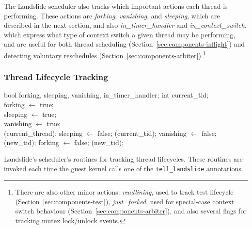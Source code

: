 The Landslide scheduler also tracks which important actions each thread is performing. These actions are {\em forking}, {\em vanishing}, and {\em sleeping}, which are described in the next section, and also {\em in\_timer\_handler} and {\em in\_context\_switch}, which express what type of context switch a given thread may be performing, and are useful for both thread scheduling (Section~\ref{sec:components-inflight}) and detecting voluntary reschedules (Section~\ref{sec:components-arbiter}).\footnote{
There are also other minor actions: {\em readlining}, used to track test lifecycle (Section~\ref{sec:components-test}), {\em just\_forked}, used for special-case context switch behaviour (Section~\ref{sec:components-arbiter}), and also several flags for tracking mutex lock/unlock events.}

\subsubsection{Thread Lifecycle Tracking}

\begin{algorithm}[t]
	\footnotesize
	\begin{algorithmic}
		\State bool forking, sleeping, vanishing, in\_timer\_handler;
		\State int current\_tid;
		\\
			\State forking $\gets$ true;
		\EndFunction
		\\
			\State sleeping $\gets$ true;
		\EndFunction
		\\
			\State vanishing $\gets$ true;
		\EndFunction
		\\
					(current\_thread);
					\State sleeping $\gets$ false;
					(current\_tid);
					\State vanishing $\gets$ false;
					(new\_tid);
					\State forking $\gets$ false;
				\EndIf
			\EndIf
			(new\_tid);
		\EndFunction
	\end{algorithmic}
	\caption{Landslide's scheduler's routines for tracking thread lifecycles. These routines are invoked each time the guest kernel calls one of the \texttt{tell\_landslide} annotations.}
	\label{alg:tell-landslide}
\end{algorithm}


